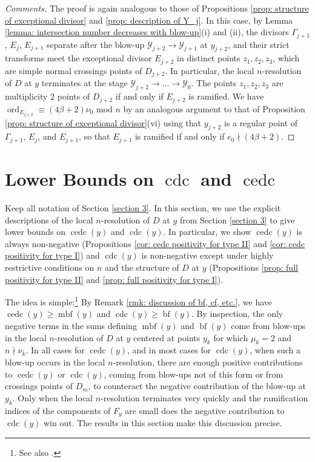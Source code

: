 \documentclass[12pt]{amsart}
\numberwithin{equation}{section}
\theoremstyle{definition}
\newcommand{\Y}{\mathcal{Y}}
\DeclareMathOperator{\blf}{bf}
\DeclareMathOperator{\mbf}{mbf}
\DeclareMathOperator{\cdc}{cdc}
\DeclareMathOperator{\cedc}{cedc}
\DeclareMathOperator{\ord}{ord}
\begin{document}
\begin{proof}[Comments]
     The proof is again analogous to those of Propositions \ref{prop: structure of exceptional divisor} and \ref{prop: description of Y_j}. In this case, by Lemma \ref{lemma: intersection number decreases with blow-up}(i) and (ii), the divisors $\Gamma_{j+1}$, $E_j$, $E_{j+1}$ separate after the blow-up $\Y_{j+2}\to\Y_{j+1}$ at $y_{j+2}$, and their strict transforms meet the exceptional divisor $E_{j+2}$ in distinct points $z_1,z_2,z_3$, which are simple normal crossings points of $D_{j+2}$. In particular, the local $n$-resolution of $D$ at $y$ terminates at the stage $\Y_{j+2}\to...\to\Y_0$. The points $z_1,z_2,z_3$ are multiplicity $2$ points of $D_{j+2}$ if and only if $E_{j+2}$ is ramified. We have $\ord_{E_{j+2}}\equiv(4\beta+2)\nu_0$ mod $n$ by an analogous argument to that of Proposition \ref{prop: structure of exceptional divisor}(vi) using that $y_{j+2}$ is a regular point of $\Gamma_{j+1}$, $E_j$, and $E_{j+1}$, so that $E_{j+1}$ is ramified if and only if $e_0\nmid(4\beta+2)$.
\end{proof}


\section{Lower Bounds on $\cdc$ and $\cedc$}\label{section 4}

Keep all notation of Section \ref{section 3}. In this section, we use the explicit descriptions of the local $n$-resolution of $D$ at $y$ from Section \ref{section 3} to give lower bounds on $\cedc(y)$ and $\cdc(y)$. In particular, we show  $\cedc(y)$ is always non-negative (Propositions \ref{cor: cedc positivity for type II} and \ref{cor: cedc positivity for type I}) and $\cdc(y)$ is non-negative except under highly restrictive conditions on $n$ and the structure of $D$ at $y$ (Propositions \ref{prop: full positivity for type II} and \ref{prop: full positivity for type I}).

The idea is simple:\footnote{See also \cite[Section 1.2]{Part1}.} By Remark \ref{rmk: discussion of bf, cf, etc.}, we have $\cedc(y)\geq\mbf(y)$ and $\cdc(y)\geq \blf(y)$. By inspection, the only negative terms in the sums defining $\mbf(y)$ and $\blf(y)$ come from blow-ups in the local $n$-resolution of $D$ at $y$ centered at points $y_k$ for which $\mu_k=2$ and $n\nmid\nu_k$. In all cases for $\cedc(y)$, and in most cases for $\cdc(y)$, when such a blow-up occurs in the local $n$-resolution, there are enough positive contributions to $\cedc(y)$ or $\cdc(y)$, coming from blow-ups not of this form or from crossings points of $D_m$, to counteract the negative contribution of the blow-up at $y_k$. Only when the local $n$-resolution terminates very quickly and the ramification indices of the components of $F_y$ are small does the negative contribution to $\cdc(y)$ win out. The results in this section make this discussion precise.
\end{document}
